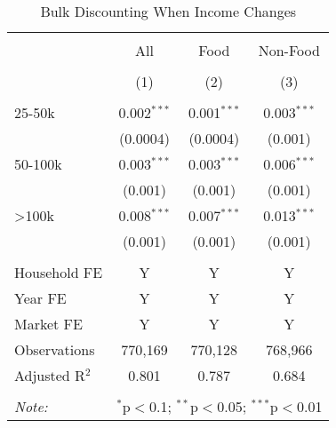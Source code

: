 
\begin{table}[!htbp] \centering 
  \caption{Bulk Discounting When Income Changes} 
  \label{tab:discountingBehaviorIncomeSwitchers} 
\begin{tabular}{@{\extracolsep{5pt}}lccc} 
\\[-1.8ex]\hline 
\hline \\[-1.8ex] 
 & All & Food & Non-Food \\ 
\\[-1.8ex] & (1) & (2) & (3)\\ 
\hline \\[-1.8ex] 
 25-50k & 0.002$^{***}$ & 0.001$^{***}$ & 0.003$^{***}$ \\ 
  & (0.0004) & (0.0004) & (0.001) \\ 
  50-100k & 0.003$^{***}$ & 0.003$^{***}$ & 0.006$^{***}$ \\ 
  & (0.001) & (0.001) & (0.001) \\ 
  >100k & 0.008$^{***}$ & 0.007$^{***}$ & 0.013$^{***}$ \\ 
  & (0.001) & (0.001) & (0.001) \\ 
 \hline \\[-1.8ex] 
Household FE & Y & Y & Y \\ 
Year FE & Y & Y & Y \\ 
Market FE & Y & Y & Y \\ 
Observations & 770,169 & 770,128 & 768,966 \\ 
Adjusted R$^{2}$ & 0.801 & 0.787 & 0.684 \\ 
\hline 
\hline \\[-1.8ex] 
\textit{Note:}  & \multicolumn{3}{l}{$^{*}$p$<$0.1; $^{**}$p$<$0.05; $^{***}$p$<$0.01} \\ 
\end{tabular} 
\end{table} 
